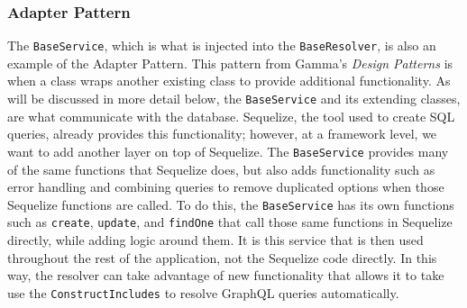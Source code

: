 \subsubsection{Adapter Pattern}
The \verb!BaseService!, which is what is injected into the \verb!BaseResolver!, is also an example of the Adapter Pattern.  This pattern from Gamma's \textit{Design Patterns} is when a class wraps another existing class to provide additional functionality.  As will be discussed in more detail below, the \verb!BaseService! and its extending classes, are what communicate with the database.  Sequelize, the tool used to create SQL queries, already provides this functionality; however, at a framework level, we want to add another layer on top of Sequelize.  The \verb!BaseService! provides many of the same functions that Sequelize does, but also adds functionality such as error handling and combining queries to remove duplicated options when those Sequelize functions are called.  To do this, the \verb!BaseService! has its own functions such as \verb!create!, \verb!update!, and \verb!findOne! that call those same functions in Sequelize directly, while adding logic around them.  It is this service that is then used throughout the rest of the application, not the Sequelize code directly.  In this way, the resolver can take advantage of new functionality that allows it to take use the \verb!ConstructIncludes! to resolve GraphQL queries automatically.
